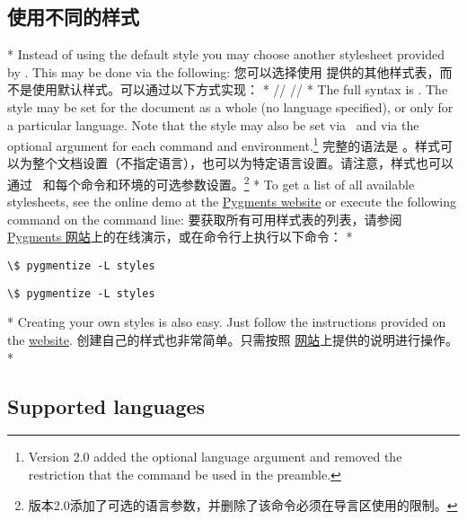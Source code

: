 \begin{paracol}{2}
\subsection{使用不同的样式}
\switchcolumn[0]*%
\DescribeMacro{\usemintedstyle}
Instead of using the default style you may choose another stylesheet provided by .  This may be done via the following:
\switchcolumn
\DescribeMacro{\usemintedstyle}
您可以选择使用  提供的其他样式表，而不是使用默认样式。可以通过以下方式实现：
\switchcolumn[0]*%
//
\switchcolumn
{}//
\switchcolumn[0]*%
The full syntax is \cmd\usemintedstyle{}.  The style may be set for the document as a whole (no language specified), or only for a particular language.  Note that the style may also be set via \cmd\setminted\ and via the optional argument for each command and environment.\footnote{Version 2.0 added the optional language argument and removed the restriction that the command be used in the preamble.}
\switchcolumn
完整的语法是 \cmd\usemintedstyle{}。样式可以为整个文档设置（不指定语言），也可以为特定语言设置。请注意，样式也可以通过 \cmd\setminted\ 和每个命令和环境的可选参数设置。\footnote{版本2.0添加了可选的语言参数，并删除了该命令必须在导言区使用的限制。}
\switchcolumn[0]*%
To get a list of all available stylesheets, see the online demo at the \href{http://pygments.org/demo/}{Pygments website} or execute the following command on the command line:
\switchcolumn
要获取所有可用样式表的列表，请参阅 \href{http://pygments.org/demo/}{Pygments 网站}上的在线演示，或在命令行上执行以下命令：
\switchcolumn[0]*%
\begin{Verbatim}[commandchars=\\\{\}]
\$ pygmentize -L styles
\end{Verbatim}
\switchcolumn
\begin{Verbatim}[commandchars=\\\{\}]
\$ pygmentize -L styles
\end{Verbatim}
\switchcolumn[0]*%
Creating your own styles is also easy. Just follow the instructions provided on the
\href{http://pygments.org/docs/styles/#creating-own-styles}{ website}.
\switchcolumn
创建自己的样式也非常简单。只需按照 \href{http://pygments.org/docs/styles/#creating-own-styles}{ 网站}上提供的说明进行操作。
\switchcolumn[0]*%
\subsection{Supported languages}
\switchcolumn

\end{paracol}
